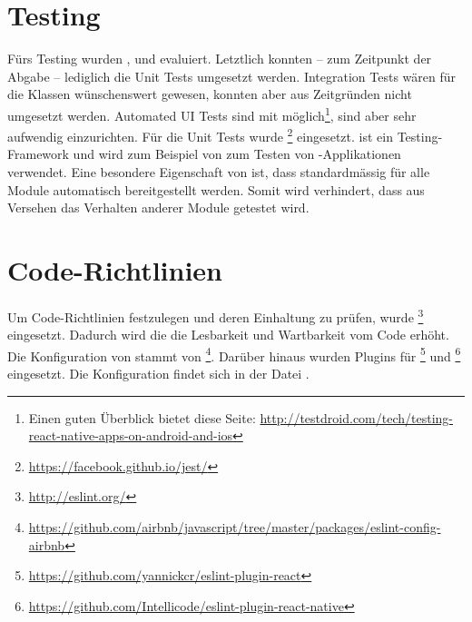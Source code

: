\section{Testing}
Fürs Testing wurden ,  und  evaluiert.
Letztlich konnten -- zum Zeitpunkt der Abgabe -- lediglich die Unit Tests umgesetzt werden.
Integration Tests wären für die  Klassen wünschenswert gewesen, konnten aber aus Zeitgründen nicht umgesetzt werden.
Automated UI Tests sind mit  möglich\footnote{Einen guten Überblick bietet diese Seite: \url{http://testdroid.com/tech/testing-react-native-apps-on-android-and-ios}}, sind aber sehr aufwendig einzurichten.
Für die Unit Tests wurde \footnote{\url{https://facebook.github.io/jest/}} eingesetzt. 
 ist ein  Testing-\gls{Framework} und wird zum Beispiel von  zum Testen von -Applikationen verwendet.\newline
Eine besondere Eigenschaft von  ist, dass standardmässig für alle Module automatisch  bereitgestellt werden.
Somit wird verhindert, dass aus Versehen das Verhalten anderer Module getestet wird.

\section{Code-Richtlinien}
\label{pd-entwicklungsumgebung-cr}
Um Code-Richtlinien festzulegen und deren Einhaltung zu prüfen, wurde \footnote{\url{http://eslint.org/}} eingesetzt.
Dadurch wird die die Lesbarkeit und Wartbarkeit vom Code erhöht.
Die Konfiguration von  stammt von \footnote{\url{https://github.com/airbnb/javascript/tree/master/packages/eslint-config-airbnb}}.
Darüber hinaus wurden Plugins für \footnote{\url{https://github.com/yannickcr/eslint-plugin-react}} und \footnote{\url{https://github.com/Intellicode/eslint-plugin-react-native}} eingesetzt.\newline
Die Konfiguration findet sich in der Datei .